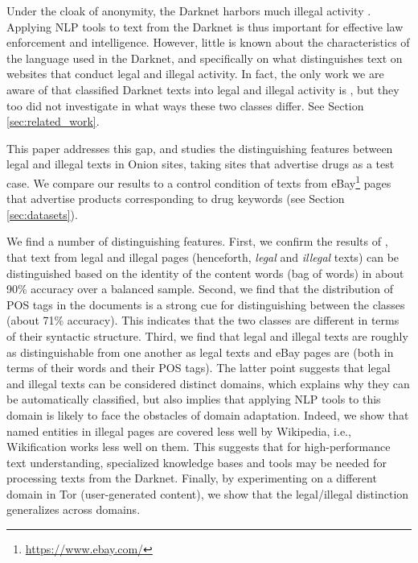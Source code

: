 \documentclass[11pt,a4paper,table]{article}
\newcommand{\es}[1]{\footnote{\color{purple}ES: #1}}
\begin{document}
  Under the cloak of anonymity, the Darknet harbors much illegal activity \citep{moore2016cryptopolitik}.
  Applying NLP tools to text from the Darknet is thus important for effective law enforcement and intelligence.
  However, little is known about the characteristics of the language used in the Darknet, 
  and specifically on what distinguishes text on websites that conduct legal and illegal activity.
	In fact, the only work we are aware of that classified Darknet texts into legal and illegal activity is \citet{Avarikioti18},
	but they too did not investigate in what ways these two classes differ. See Section \ref{sec:related_work}.
  
  
  This paper addresses this gap, and studies the distinguishing features between legal and illegal texts in Onion sites,
  taking sites that advertise drugs as a test case. We compare our results to a control condition of texts 
  from eBay\footnote{\url{https://www.ebay.com/}} pages that 
	advertise products corresponding to drug keywords (see Section \ref{sec:datasets}).
 
  We find a number of distinguishing features. First, we confirm the results of \citet{Avarikioti18}, 
	that text from legal and illegal pages (henceforth, {\it legal} and {\it illegal} texts) can be distinguished based on the identity of the content words (bag of words) 
  in about 90\% accuracy over a balanced sample. Second, we find that the distribution of POS tags in the documents is a strong cue for 
	distinguishing between the classes (about 71\% accuracy). This indicates that the two classes are different in 
	terms of their syntactic structure. Third, we find that legal and illegal texts are roughly as distinguishable from one another as legal 
	texts and eBay pages are (both in terms of their words and their POS tags). 
	The latter point suggests that legal and illegal texts can be considered distinct domains, which explains why they can be 
	automatically classified, but also implies that applying NLP tools to this domain is likely to face the obstacles of domain adaptation.  
  Indeed, we show that named entities in illegal pages are covered less well by Wikipedia, i.e., Wikification works less well on them.
  This suggests that for high-performance text understanding, specialized knowledge bases and tools may be needed for processing texts from the Darknet.
  Finally, by experimenting on a different domain in Tor (user-generated content), we show that the legal/illegal distinction generalizes across domains.
\end{document}
